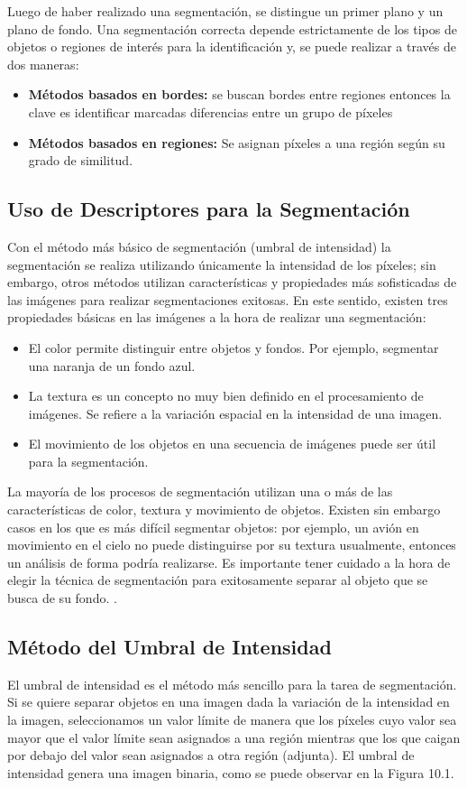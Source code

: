 Luego de haber realizado una segmentación, se distingue un primer plano y un plano de fondo. Una segmentación correcta depende estrictamente de los tipos de objetos o regiones de interés para la identificación y, se puede realizar a través de dos maneras:
\begin{itemize}
\item \textbf{Métodos basados en bordes:} se buscan bordes entre regiones entonces la clave es identificar marcadas diferencias entre un grupo de píxeles
\item \textbf{Métodos basados en regiones:} Se asignan píxeles a una región según su grado de similitud.
\end{itemize}

\subsection{Uso de Descriptores para la Segmentación}
Con el método más básico de segmentación (umbral de intensidad) la segmentación se realiza utilizando únicamente la intensidad de los píxeles; sin embargo, otros métodos utilizan características y propiedades más sofisticadas de las imágenes para realizar segmentaciones exitosas. En este sentido, existen tres propiedades básicas en las imágenes a la hora de realizar una segmentación:
\begin{itemize}
\item El color permite distinguir entre objetos y fondos. Por ejemplo, segmentar una naranja de un fondo azul.
\item La textura es un concepto no muy bien definido en el procesamiento de imágenes. Se refiere a la variación espacial en la intensidad de una imagen.
\item El movimiento de los objetos en una secuencia de imágenes puede ser útil para la segmentación. 
\end{itemize}
La mayoría de los procesos de segmentación utilizan una o más de las características de color, textura y movimiento de objetos. Existen sin embargo casos en los que es más difícil segmentar objetos: por ejemplo, un avión en movimiento en el cielo no puede distinguirse por su textura usualmente, entonces un análisis de forma podría realizarse. Es importante tener cuidado a la hora de elegir la técnica de segmentación para exitosamente separar al objeto que se busca de su fondo. \parencite{Solomon2011-xz}.

\subsection{Método del Umbral de Intensidad}
El umbral de intensidad es el método más sencillo para la tarea de segmentación. Si se quiere separar objetos en una imagen dada la variación de la intensidad en la imagen, seleccionamos un valor límite de manera que los píxeles cuyo valor sea mayor que el valor límite sean asignados a una región mientras que los que caigan por debajo del valor sean asignados a otra región (adjunta). El umbral de intensidad genera una imagen binaria, como se puede observar en la Figura 10.1.

